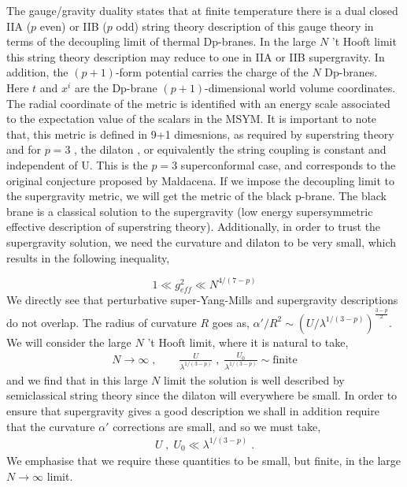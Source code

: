 The gauge/gravity duality \cite{Itzhaki:1998dd} 
states that at finite temperature there is a dual closed IIA ($p$ even) or IIB ($p$ odd)
 string theory description of this gauge theory in terms of the decoupling limit of thermal Dp-branes. 
 In the large $N$ 't Hooft limit this string theory description may reduce to one in IIA or IIB supergravity. 
In addition, the $(p+1)$-form potential carries the charge of the $N$ Dp-branes. Here $t$ and $x^i$ 
are the Dp-brane $(p+1)$-dimensional world volume coordinates. The radial coordinate of the metric 
is identified with an energy scale associated to the expectation value of the scalars in the MSYM. 
It is important to note that, this metric is defined in 9+1 dimesnions, as required by superstring theory and 
for $p=3$ , the dilaton , or equivalently the string coupling is constant and independent of U.
This is the $p=3$ superconformal case, and corresponds to the original conjecture proposed by Maldacena. 
If we impose the decoupling limit to the supergravity metric, we will get the metric of the black p-brane. 
The black brane is a classical solution to the supergravity (low energy supersymmetric effective 
description of superstring theory). Additionally, in 
order to trust the supergravity solution, we need the curvature and 
dilaton to be very small, which results in the following inequality, 

\begin{equation}
1 \ll g_{eff}^{2} \ll N^{4/(7-p)} 
\end{equation}
We directly see that perturbative super-Yang-Mills and supergravity descriptions do not overlap. 
The radius of curvature $R$ goes as,
$
\alpha' /R^2 \sim \left( U / \lambda^{1/(3-p) } \right)^{\frac{3-p}{2} } 
$. 
We will consider the large $N$ 't Hooft limit, where it is natural to take,
\begin{eqnarray}
N \to \infty \; , \qquad \frac{U}{\lambda^{1/(3-p)}}  \; , \; \frac{U_0}{\lambda^{1/(3-p)}}  \sim \mathrm{finite}
\end{eqnarray}
and we find that in this large $N$ limit the solution is well described by 
semiclassical string theory since the dilaton will everywhere be small. In order to ensure that supergravity 
gives a good description we shall in addition require that the curvature $\alpha'$ corrections are small, 
and so we must take,
\begin{eqnarray}
U  \; , \; U_0 \ll \lambda^{1/(3-p)} \; .
\end{eqnarray}
We emphasise that we require these quantities to be small, but finite, in the large $N \to \infty$ limit. 


